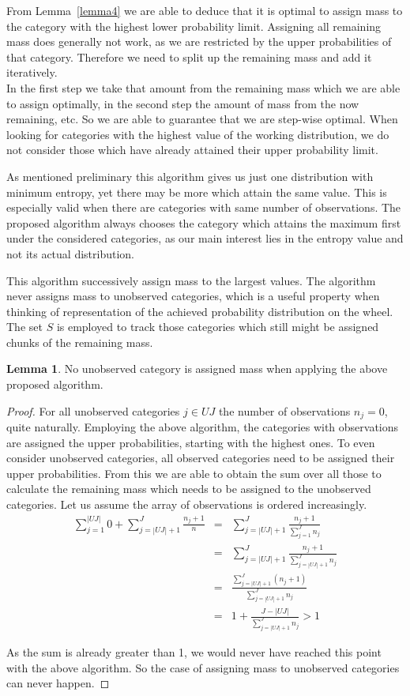 \documentclass[a4paper]{article}
\theoremstyle{definition} \newtheorem{lemma}{Lemma}
\theoremstyle{remark} \newtheorem{remark}{Remark}
\begin{document}
From Lemma~\ref{lemma4} we are able to deduce that it is optimal to assign mass to the category with the highest lower probability limit. Assigning all remaining mass does generally not work, as we are restricted by the upper probabilities of that category. Therefore we need to split up the remaining mass and add it iteratively.\\

In the first step we take that amount from the remaining mass which we are able to assign optimally, in the second step the amount of mass from the now remaining, etc. So we are able to guarantee that we are step-wise optimal. When looking for categories with the highest value of the working distribution, we do not consider those which have already attained their upper probability limit.

As mentioned preliminary this algorithm gives us just one distribution with minimum entropy, yet there may be more which attain the same value. This is especially valid when there are categories with same number of observations. The proposed algorithm always chooses the category which attains the maximum first under the considered categories, as our main interest lies in the entropy value and not its actual distribution.

This algorithm successively assign mass to the largest values. The algorithm never assigns mass to unobserved categories, which is a useful property when thinking of representation of the achieved probability distribution on the wheel. The set $S$ is employed to track those categories which still might be assigned chunks of the remaining mass.

\begin{lemma}
\label{lemma5}
No unobserved category is assigned mass when applying the above proposed algorithm.
\end{lemma}
\begin{proof}
For all unobserved categories $j \in UJ$ the number of observations $n_j = 0$, quite naturally. Employing the above algorithm, the categories with observations are assigned the upper probabilities, starting with the highest ones. To even consider unobserved categories, all observed categories need to be assigned their upper probabilities. From this we are able to obtain the sum over all those to calculate the remaining mass which needs to be assigned to the unobserved categories. Let us assume the array of observations is ordered increasingly.
\begin{eqnarray*}
\sum_{j=1}^{|UJ|} 0 + \sum_{j=|UJ|+1}^J \frac{n_j+1}{n} & = & \sum_{j=|UJ|+1}^J \frac{n_j+1}{\sum_{j=1}^J n_j}\\
& = & \sum_{j=|UJ|+1}^J \frac{n_j+1}{\sum_{j=|UJ|+1}^J n_j}\\
& = & \frac{\sum_{j=|UJ|+1}^J (n_j+1)}{\sum_{j=|UJ|+1}^J n_j}\\
& = & 1 + \frac{J - |UJ|}{\sum_{j=|UJ|+1}^J n_j} > 1
\end{eqnarray*} 

As the sum is already greater than 1, we would never have reached this point with the above algorithm. So the case of assigning mass to unobserved categories can never happen.
\end{proof}
\end{document}
